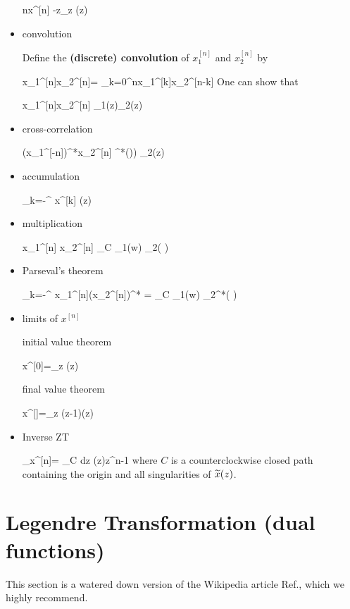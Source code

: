 \begin{itemize}
\beq
nx^{[n]}
\maparrow{\calz}
-z\partial_z (z)
\eeq

\item convolution

Define the {\bf (discrete)
convolution} 
of $x_1^{[n]}$
and $x_2^{[n]}$ by

\beq
x_1^{[n]}\circledast x_2^{[n]}=
\sum_{k=0}^nx_1^{[k]}x_2^{[n-k]}
\eeq
One can show that

\beq
x_1^{[n]}\circledast x_2^{[n]}
\maparrow{\calz}
_1(z)_2(z)
\eeq

\item cross-correlation

\beq
(x_1^{[-n]})^*\circledast x_2^{[n]}
\maparrow{\calz}
^*\left(\right))
_2(z)
\eeq

\item accumulation

\beq
\sum_{k=-\infty}^\infty
x^{[k]}
\maparrow{\calz}
(z)
\eeq

\item multiplication

\beq
x_1^{[n]} x_2^{[n]}
\maparrow{\calz}
\oint_C \;
_1(w)
_2\left(
{\color{red}}
\right)
\eeq

\item Parseval's theorem

\beq
\sum_{k=-\infty}^{\infty}
x_1^{[n]}(x_2^{[n]})^*
=
\oint_C \;
_1(w)
_2^*\left(
{\color{red}
}
\right)
\eeq

\item limits of $x^{[n]}$

initial value theorem

\beq
x^{[0]}=\lim_{z\rarrow \infty}
(z)
\eeq

final value theorem

\beq
x^{[\infty]}=\lim_{z}
(z-1)(z)
\eeq

\item Inverse ZT

\beq
{}
_{x^{[n]}}=
\oint_C dz\;
(z)z^{n-1}
\eeq
where $C$
is a counterclockwise
closed path
containing the origin and
all singularities 
of ${\widetilde{x}}(z)$.

\end{itemize}


\section{Legendre Transformation (dual functions)}
\label{sec-dual-fun}
This section is a
watered down version of
the Wikipedia article 
Ref.\cite{wiki-legendre-transformation},
which we highly recommend.



